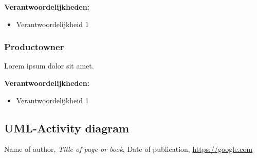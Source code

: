\documentclass[12pt]{article}
\begin{document}
\medskip
\noindent\textbf{Verantwoordelijkheden:}
\begin{itemize}
	\item Verantwoordelijkheid 1
\end{itemize}

\subsubsection{Productowner}
Lorem ipsum dolor sit amet.

\medskip
\noindent\textbf{Verantwoordelijkheden:}
\begin{itemize}
	\item Verantwoordelijkheid 1
\end{itemize}



\subsection{UML-Activity diagram}





\begin{thebibliography}{9}
	Name of author,
	\textit{Title of page or book},
	Date of publication,
	\url{https://google.com}
\end{thebibliography}
\end{document}
